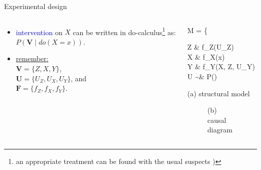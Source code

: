 %
%
\begin{frame}
	{Experimental design}
	\begin{columns}
		\begin{column}{0.5\textwidth}
			\begin{itemize}
				\item \textcolor{blue}{intervention} on $X$ can be written in do-calculus\footnote{an appropriate treatment can be found with the usual suspects \cite{Pearl_1988, Pearl_2009, Pearl_et_al_2016, Pearl_et_al_2018})} as: $P(\pmb{V} \; | \; do(X=x))$.
				\item \underline{remember:} \\
				$\pmb{V}=\{Z,X,Y\}$, \\
				$\pmb{U}=\{U_{Z},U_{X},U_{Y}\}$, and \\
				$\pmb{F}=\{f_{Z},f_{X},f_{Y}\}$.
			\end{itemize}
		\end{column}
		\begin{column}{0.5\textwidth}  
			\begin{equ}
				M = \left\{ \begin{aligned} 
					Z \leftarrow & \; f_{Z}(U_{Z}) \\
					X \leftarrow & \; f_{X}(x) \\
					Y \leftarrow & \; f_{Y}(X, Z, U_{Y}) \\
					U \sim & \; P()
				\end{aligned} \right
				\caption*{(a) structural model}
			\end{equ}
			\begin{figure}
				\caption*{(b) causal diagram}
			\end{figure}
		\end{column}
	\end{columns}
\end{frame}
